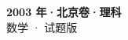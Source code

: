 \documentclass[zihao=-4, a4paper]{ctexart}
\begin{document}
\begin{center}
  {\Large\bfseries 2003 年·北京卷·理科}\\[4pt]
  {\large 数学 · 试题版}
\end{center}
\medskip
{}

\end{document}
